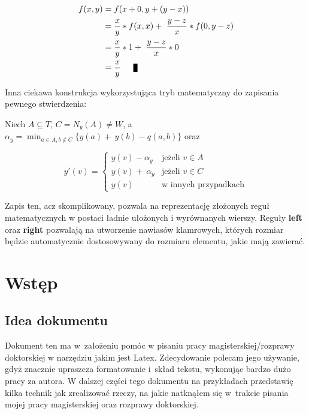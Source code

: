 \documentclass[twoside,a4paper]{book}
\newenvironment{proof}[1][Dowód]{\begin{trivlist}
\item[\hskip \labelsep {\bfseries #1}]}{\end{trivlist}}
\newcommand{\qed}{\nobreak \ifvmode \relax \else
      \ifdim\lastskip<1.5em \hskip-\lastskip
      \hskip1.5em plus0em minus0.5em \fi \nobreak
      \vrule height0.75em width0.5em depth0.25em\fi}
\begin{document}
\begin{proof}
	\begin{equation*}
	\begin{split}
	f(x,y)&=f(x+0,y+(y-x))\\
	&=\frac{x}{y}*f(x,x) +~\frac{y-z}{x}*f(0,y-z)\\
	&=\frac{x}{y}*1 +~\frac{y-z}{x}*0\\
	&=\frac{x}{y} \qed
	\end{split}
	\end{equation*}
\end{proof}

Inna ciekawa konstrukcja wykorzystująca tryb matematyczny do zapisania pewnego stwierdzenia:

Niech $A \subseteq T$, $C = N_y(A) \neq W$, a~$\alpha_y = \min_{a \in A, b\notin C} \{y(a) +~y(b) - q(a, b)\}$ oraz

\[ y'(v) = \left\{ \begin{array}{ll}
y(v) - \alpha_y & \mbox{jeżeli $v \in A$} \\
y(v) +~\alpha_y & \mbox{jeżeli $v \in C$} \\
y(v)            & \mbox{w innych przypadkach}
\end{array}
\right. \]

Zapis ten, acz skomplikowany, pozwala na reprezentację złożonych reguł matematycznych w postaci ładnie ułożonych i wyrównanych wierszy. Reguły \textbf{left} oraz \textbf{right} pozwalają na utworzenie nawiasów klamrowych, których rozmiar będzie automatycznie dostosowywany do rozmiaru elementu, jakie mają zawierać.


















\chapter{Wstęp}
\section{Idea dokumentu}

Dokument ten ma w~założeniu pomóc w pisaniu pracy magisterskiej/rozprawy doktorskiej w narzędziu jakim jest Latex. Zdecydowanie polecam jego używanie, gdyż znacznie upraszcza formatowanie i~skład tekstu, wykonując bardzo dużo pracy za autora. W dalszej części tego dokumentu na przykładach przedstawię kilka technik jak zrealizować rzeczy, na jakie natknąłem się w~trakcie pisania mojej pracy magisterskiej oraz rozprawy doktorskiej.
\end{document}
